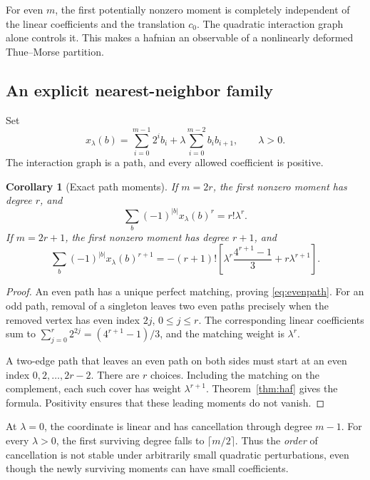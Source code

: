 \documentclass[11pt,oneside]{article}
\numberwithin{equation}{section}
\newtheorem{corollary}[theorem]{Corollary}
\theoremstyle{definition}
\theoremstyle{remark}
\begin{document}
For even \(m\), the first potentially nonzero moment is completely independent
of the linear coefficients and the translation \(c_0\). The quadratic
interaction graph alone controls it. This makes a hafnian an observable of a
nonlinearly deformed Thue--Morse partition.

\subsection{An explicit nearest-neighbor family}
Set
\begin{equation}
 x_\lambda(b)=\sum_{i=0}^{m-1}2^ib_i
              +\lambda\sum_{i=0}^{m-2}b_ib_{i+1},\qquad \lambda>0.
 \label{eq:pathgeometry}
\end{equation}
The interaction graph is a path, and every allowed coefficient is positive.

\begin{corollary}[Exact path moments]
\label{cor:path}
If \(m=2r\), the first nonzero moment has degree \(r\), and
\begin{equation}
 \sum_b(-1)^{|b|}x_\lambda(b)^r=r!\lambda^r.
 \label{eq:evenpath}
\end{equation}
If \(m=2r+1\), the first nonzero moment has degree \(r+1\), and
\begin{equation}
 \sum_b(-1)^{|b|}x_\lambda(b)^{r+1}
 =-(r+1)!\left[
     \lambda^r\frac{4^{r+1}-1}{3}+r\lambda^{r+1}\right].
 \label{eq:oddpath}
\end{equation}
\end{corollary}
\begin{proof}
An even path has a unique perfect matching, proving
\eqref{eq:evenpath}. For an odd path, removal of a singleton leaves two
even paths precisely when the removed vertex has even index \(2j\),
\(0\le j\le r\). The corresponding linear coefficients sum to
\(\sum_{j=0}^r2^{2j}=(4^{r+1}-1)/3\), and the matching weight is
\(\lambda^r\).

A two-edge path that leaves an even path on both sides must start at an even
index \(0,2,\ldots,2r-2\). There are \(r\) choices. Including the matching
on the complement, each such cover has weight \(\lambda^{r+1}\).
Theorem~\ref{thm:haf} gives the formula. Positivity ensures that these leading
moments do not vanish.
\end{proof}

At \(\lambda=0\), the coordinate is linear and has cancellation through degree
\(m-1\). For every \(\lambda>0\), the first surviving degree falls to
\(\lceil m/2\rceil\). Thus the \emph{order} of cancellation is not stable under
arbitrarily small quadratic perturbations, even though the newly surviving
moments can have small coefficients.
\end{document}
